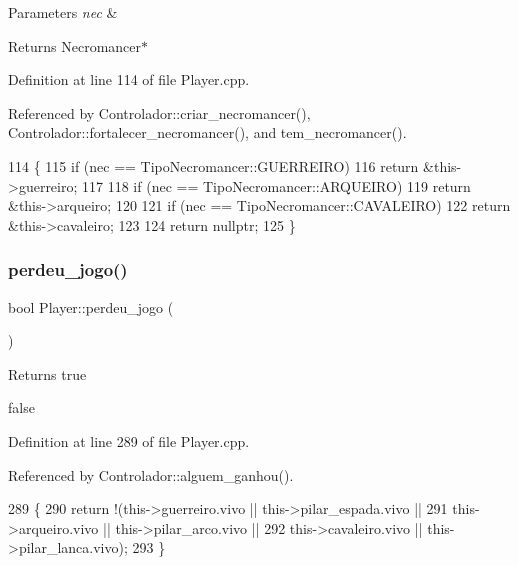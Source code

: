 \begin{DoxyParams}{Parameters}
{\em nec} & \\
\hline
\end{DoxyParams}
\begin{DoxyReturn}{Returns}
Necromancer$\ast$ 
\end{DoxyReturn}


Definition at line 114 of file Player.\+cpp.



Referenced by Controlador\+::criar\+\_\+necromancer(), Controlador\+::fortalecer\+\_\+necromancer(), and tem\+\_\+necromancer().


\begin{DoxyCode}
114                                                     \{
115     \textcolor{keywordflow}{if} (nec == TipoNecromancer::GUERREIRO)
116         \textcolor{keywordflow}{return} &this->guerreiro;
117 
118     \textcolor{keywordflow}{if} (nec == TipoNecromancer::ARQUEIRO)
119         \textcolor{keywordflow}{return} &this->arqueiro;
120 
121     \textcolor{keywordflow}{if} (nec == TipoNecromancer::CAVALEIRO)
122         \textcolor{keywordflow}{return} &this->cavaleiro;
123 
124     \textcolor{keywordflow}{return} \textcolor{keyword}{nullptr};
125 \}
\end{DoxyCode}
\mbox{\label{class_player_aad208bab9f9f88af5ac34ebe7c31dc61}} 
\subsubsection{\texorpdfstring{perdeu\+\_\+jogo()}{perdeu\_jogo()}}
{\footnotesize\ttfamily bool Player\+::perdeu\+\_\+jogo (\begin{DoxyParamCaption}{ }\end{DoxyParamCaption})}

\begin{DoxyReturn}{Returns}
true 

false 
\end{DoxyReturn}


Definition at line 289 of file Player.\+cpp.



Referenced by Controlador\+::alguem\+\_\+ganhou().


\begin{DoxyCode}
289                          \{
290     \textcolor{keywordflow}{return} !(this->guerreiro.vivo || this->pilar\_espada.vivo ||
291     this->arqueiro.vivo || this->pilar\_arco.vivo ||
292     this->cavaleiro.vivo || this->pilar\_lanca.vivo);
293 \}
\end{DoxyCode}
\mbox{\label{class_player_aa953125244cebb04b2363ae102c5fbf6}} 
